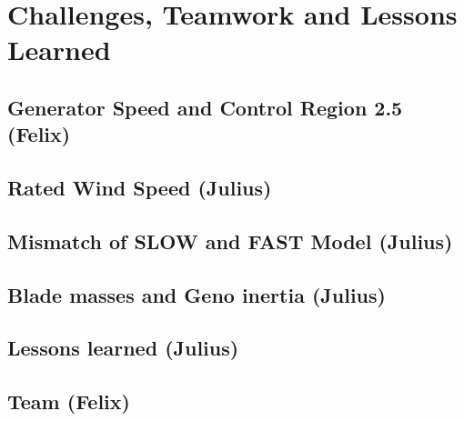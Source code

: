 \chapter{Challenges, Teamwork and Lessons Learned}

\section{Generator Speed and Control Region 2.5 (Felix)}

\section{Rated Wind Speed (Julius)} \label{RatedWindSpeed}


\section{Mismatch of SLOW and FAST Model (Julius)}


\section{Blade masses and Geno inertia (Julius)}

\section{Lessons learned (Julius)}

\section{Team (Felix)}


